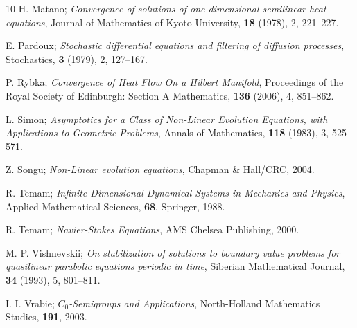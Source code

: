 \documentclass[reqno]{amsart}
\begin{document}
\begin{thebibliography}{10}
 H. Matano;
\emph{Convergence of solutions of one-dimensional semilinear heat equations},
Journal of Mathematics of Kyoto University, \textbf{18} (1978), 2, 221--227.

 E. Pardoux;
\emph{Stochastic differential equations and filtering of diffusion processes},
 Stochastics, \textbf{3}  (1979), 2, 127--167.

 P. Rybka;
\emph{Convergence of Heat Flow On a Hilbert Manifold},
Proceedings of the Royal Society of Edinburgh: Section A Mathematics,
\textbf{136}  (2006), 4, 851--862.

 L. Simon;
\emph{Asymptotics for a Class of Non-Linear Evolution Equations,
with Applications to Geometric Problems}, Annals of Mathematics,
\textbf{118} (1983), 3, 525--571.

 Z. Songu;
\emph{Non-Linear evolution equations}, Chapman \& Hall/CRC, 2004.

 R. Temam;
\emph{Infinite-Dimensional Dynamical Systems in Mechanics and Physics},
 Applied Mathematical Sciences, \textbf{68}, Springer, 1988.

 R. Temam;
\emph{Navier-Stokes Equations}, AMS Chelsea Publishing, 2000.

 M. P. Vishnevskii;
\emph{On stabilization of solutions to boundary value problems for quasilinear
 parabolic equations periodic in time}, Siberian Mathematical Journal,
\textbf{34}  (1993), 5, 801--811.

 I. I. Vrabie;
\emph{ $C_{0}$-Semigroups and Applications},
 North-Holland Mathematics Studies, \textbf{191}, 2003.

\end{thebibliography}
\end{document}
